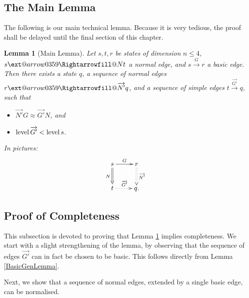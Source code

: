 \documentclass{dalthesis}
\makeatletter
\theoremstyle{theorem}
\newtheorem{lemma}[theorem]{Lemma}
\theoremstyle{definition}
\theoremstyle{definition}  %
\theoremstyle{definition}
\renewcommand{\:}{\mathbin{:}}
\newcommand{\xRightarrow}[2][]{\ext@arrow
  0359\Rightarrowfill@{#1}{#2}}
\newcommand{\level}{\mathop{\rm level}\nolimits}
\newcommand{\edge}{\xrightarrow}
\newcommand{\nedge}{\xRightarrow}
\renewcommand{\vec}{\overrightarrow}
\makeatother
\begin{document}
\subsection{The Main Lemma}

The following is our main technical lemma. Because it is very tedious, the proof shall be delayed until the final section of this chapter.

\begin{lemma}[Main Lemma]
\label{TechLemma}
  Let $s,t,r$ be states of dimension $n\leq 4$, $s\nedge{N} t$ a normal edge, and $s\edge{G} r$ a basic edge. Then there exists a state $q$, a sequence of normal edges $r\nedge{\vec{N'}}q$, and a sequence of simple edges $t\edge{\vec{G'}}q$, such that 
  \begin{itemize}
  \item $\vec{N'}G\approx\vec{G'}N$, and 
  \item $\level{\vec{G'}} < \level{s}$.
  \end{itemize}
  In pictures:
    \[ \xymatrix{
    s \ar@{=>}[d]_{N} \ar[r]^{G} &
    r \ar@{:>}[d]^{\vec{N'}} \\
    t \ar@{.>}[r]^{\vec{G'}} &
    q.
  }
  \]
\end{lemma}

\subsection{Proof of Completeness}

This subsection is devoted to proving that Lemma \ref{TechLemma} implies completeness. We start with a slight strengthening of the lemma, by observing that the sequence of edges $\vec{G'}$ can in fact be chosen to be basic. This follows directly from Lemma \ref{BasicGenLemma}. 

Next, we show that a sequence of normal edges, extended by a single basic edge, can be normalised.
\end{document}
